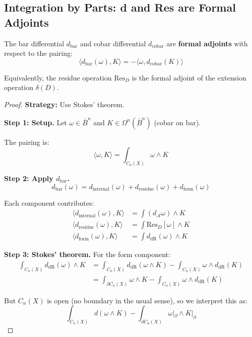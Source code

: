 \subsection{Integration by Parts: d and Res are Formal Adjoints}

\begin{theorem}\label{thm:integration-by-parts}
The bar differential $d_{\text{bar}}$ and cobar differential $d_{\text{cobar}}$ are
\textbf{formal adjoints} with respect to the pairing:
$$\langle d_{\text{bar}}(\omega), K \rangle = -\langle \omega, d_{\text{cobar}}(K) \rangle$$

Equivalently, the residue operation $\text{Res}_D$ is the formal adjoint of the
extension operation $\delta(D)$.
\end{theorem}

\begin{proof}
\textbf{Strategy:} Use Stokes' theorem.

\textbf{Step 1: Setup.}
Let $\omega \in \bar{B}^n$ and $K \in \Omega^n(\bar{B}^n)$ (cobar on bar).

The pairing is:
$$\langle \omega, K \rangle = \int_{C_n(X)} \omega \wedge K$$

\textbf{Step 2: Apply $d_{\text{bar}}$.}
$$d_{\text{bar}}(\omega) = d_{\text{internal}}(\omega) + d_{\text{residue}}(\omega) + 
d_{\text{form}}(\omega)$$

Each component contributes:
\begin{align*}
\langle d_{\text{internal}}(\omega), K \rangle &= \int (d_{\mathcal{A}}\omega) \wedge K\\
\langle d_{\text{residue}}(\omega), K \rangle &= \int \text{Res}_D[\omega] \wedge K\\
\langle d_{\text{form}}(\omega), K \rangle &= \int d_{\text{dR}}(\omega) \wedge K
\end{align*}

\textbf{Step 3: Stokes' theorem.}
For the form component:
\begin{align*}
\int_{C_n(X)} d_{\text{dR}}(\omega) \wedge K &= \int_{C_n(X)} d_{\text{dR}}(\omega \wedge K) 
- \int_{C_n(X)} \omega \wedge d_{\text{dR}}(K)\\
&= \int_{\partial C_n(X)} \omega \wedge K - \int_{C_n(X)} \omega \wedge d_{\text{dR}}(K)
\end{align*}

But $C_n(X)$ is open (no boundary in the usual sense), so we interpret this as:
$$\int_{\overline{C}_n(X)} d(\omega \wedge K) - \int_{\partial \overline{C}_n(X)} \omega|_{\partial} 
\wedge K|_{\partial}$$


\end{proof}
